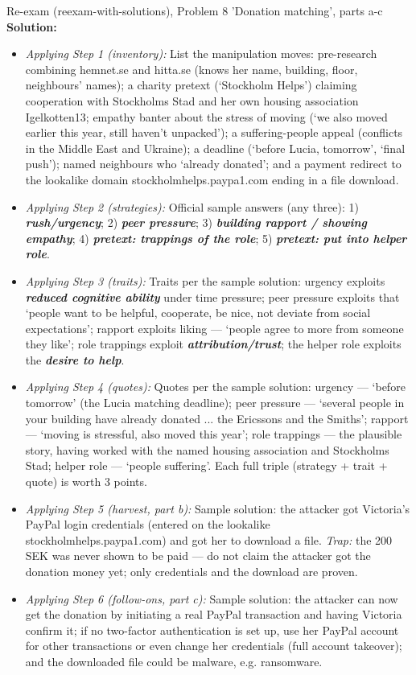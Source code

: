 \documentclass[12pt, a4paper]{article}
\newcommand{\term}[1]{\textbf{\textit{#1}}}        %
\begin{document}
\begin{practicebox}{Re-exam (reexam-with-solutions), Problem 8 'Donation matching', parts a-c}
\textbf{Solution:}
\begin{itemize}
    \item \textit{Applying Step 1 (inventory):} List the manipulation moves: pre-research combining hemnet.se and hitta.se (knows her name, building, floor, neighbours' names); a charity pretext (`Stockholm Helps') claiming cooperation with Stockholms Stad and her own housing association Igelkotten13; empathy banter about the stress of moving (`we also moved earlier this year, still haven't unpacked'); a suffering-people appeal (conflicts in the Middle East and Ukraine); a deadline (`before Lucia, tomorrow', `final push'); named neighbours who `already donated'; and a payment redirect to the lookalike domain stockholmhelps.paypa1.com ending in a file download.
    \item \textit{Applying Step 2 (strategies):} Official sample answers (any three): 1) \term{rush/urgency}; 2) \term{peer pressure}; 3) \term{building rapport / showing empathy}; 4) \term{pretext: trappings of the role}; 5) \term{pretext: put into helper role}.
    \item \textit{Applying Step 3 (traits):} Traits per the sample solution: urgency exploits \term{reduced cognitive ability} under time pressure; peer pressure exploits that `people want to be helpful, cooperate, be nice, not deviate from social expectations'; rapport exploits liking --- `people agree to more from someone they like'; role trappings exploit \term{attribution/trust}; the helper role exploits the \term{desire to help}.
    \item \textit{Applying Step 4 (quotes):} Quotes per the sample solution: urgency --- `before tomorrow' (the Lucia matching deadline); peer pressure --- `several people in your building have already donated ... the Ericssons and the Smiths'; rapport --- `moving is stressful, also moved this year'; role trappings --- the plausible story, having worked with the named housing association and Stockholms Stad; helper role --- `people suffering'. Each full triple (strategy + trait + quote) is worth 3 points.
    \item \textit{Applying Step 5 (harvest, part b):} Sample solution: the attacker got Victoria's PayPal login credentials (entered on the lookalike stockholmhelps.paypa1.com) and got her to download a file. \emph{Trap:} the 200 SEK was never shown to be paid --- do not claim the attacker got the donation money yet; only credentials and the download are proven.
    \item \textit{Applying Step 6 (follow-ons, part c):} Sample solution: the attacker can now get the donation by initiating a real PayPal transaction and having Victoria confirm it; if no two-factor authentication is set up, use her PayPal account for other transactions or even change her credentials (full account takeover); and the downloaded file could be malware, e.g. ransomware.

\end{itemize}
\end{practicebox}
\end{document}
